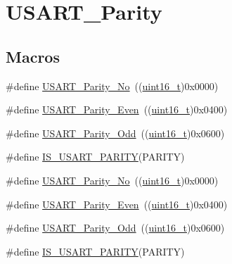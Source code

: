 \hypertarget{group___u_s_a_r_t___parity}{}\section{U\+S\+A\+R\+T\+\_\+\+Parity}
\label{group___u_s_a_r_t___parity}
\subsection*{Macros}
\begin{DoxyCompactItemize}
\item 
\#define \hyperlink{group___u_s_a_r_t___parity_gab9deebcb0a859360dfec85074abaa3aa}{U\+S\+A\+R\+T\+\_\+\+Parity\+\_\+\+No}~((\hyperlink{_p_e___types_8h_a1f1825b69244eb3ad2c7165ddc99c956}{uint16\+\_\+t})0x0000)
\item 
\#define \hyperlink{group___u_s_a_r_t___parity_ga62193247d36fffe982e159c1f246271e}{U\+S\+A\+R\+T\+\_\+\+Parity\+\_\+\+Even}~((\hyperlink{_p_e___types_8h_a1f1825b69244eb3ad2c7165ddc99c956}{uint16\+\_\+t})0x0400)
\item 
\#define \hyperlink{group___u_s_a_r_t___parity_gafcd68937a6b4b8ffff8f96e68d6a5ecd}{U\+S\+A\+R\+T\+\_\+\+Parity\+\_\+\+Odd}~((\hyperlink{_p_e___types_8h_a1f1825b69244eb3ad2c7165ddc99c956}{uint16\+\_\+t})0x0600)
\item 
\#define \hyperlink{group___u_s_a_r_t___parity_gaa87b2e338e0ccc42887d3c56901bee87}{I\+S\+\_\+\+U\+S\+A\+R\+T\+\_\+\+P\+A\+R\+I\+TY}(P\+A\+R\+I\+TY)
\item 
\#define \hyperlink{group___u_s_a_r_t___parity_gab9deebcb0a859360dfec85074abaa3aa}{U\+S\+A\+R\+T\+\_\+\+Parity\+\_\+\+No}~((\hyperlink{_p_e___types_8h_a1f1825b69244eb3ad2c7165ddc99c956}{uint16\+\_\+t})0x0000)
\item 
\#define \hyperlink{group___u_s_a_r_t___parity_ga62193247d36fffe982e159c1f246271e}{U\+S\+A\+R\+T\+\_\+\+Parity\+\_\+\+Even}~((\hyperlink{_p_e___types_8h_a1f1825b69244eb3ad2c7165ddc99c956}{uint16\+\_\+t})0x0400)
\item 
\#define \hyperlink{group___u_s_a_r_t___parity_gafcd68937a6b4b8ffff8f96e68d6a5ecd}{U\+S\+A\+R\+T\+\_\+\+Parity\+\_\+\+Odd}~((\hyperlink{_p_e___types_8h_a1f1825b69244eb3ad2c7165ddc99c956}{uint16\+\_\+t})0x0600)
\item 
\#define \hyperlink{group___u_s_a_r_t___parity_gaa87b2e338e0ccc42887d3c56901bee87}{I\+S\+\_\+\+U\+S\+A\+R\+T\+\_\+\+P\+A\+R\+I\+TY}(P\+A\+R\+I\+TY)
\end{DoxyCompactItemize}


